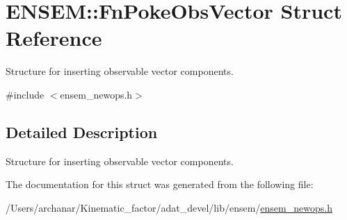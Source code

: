\hypertarget{structENSEM_1_1FnPokeObsVector}{}\section{E\+N\+S\+EM\+:\+:Fn\+Poke\+Obs\+Vector Struct Reference}
\label{structENSEM_1_1FnPokeObsVector}


Structure for inserting observable vector components.  




{\ttfamily \#include $<$ensem\+\_\+newops.\+h$>$}



\subsection{Detailed Description}
Structure for inserting observable vector components. 

The documentation for this struct was generated from the following file\+:\begin{DoxyCompactItemize}
\item 
/\+Users/archanar/\+Kinematic\+\_\+factor/adat\+\_\+devel/lib/ensem/\mbox{\hyperlink{lib_2ensem_2ensem__newops_8h}{ensem\+\_\+newops.\+h}}\end{DoxyCompactItemize}
